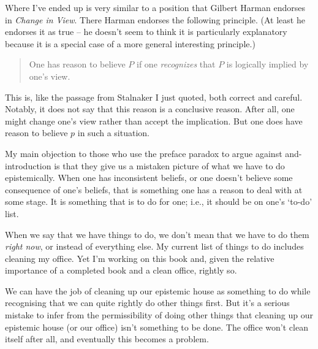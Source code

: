 \documentclass[11pt,]{book}
\begin{document}
Where I've ended up is very similar to a position that Gilbert Harman endorses in \emph{Change in View}. There Harman endorses the following principle. (At least he endorses it as true -- he doesn't seem to think it is particularly explanatory because it is a special case of a more general interesting principle.)

\begin{quote}
One has reason to believe \(P\) if one \emph{recognizes} that \(P\) is logically
implied by one's view. \citep[ 17]{Harman1986}
\end{quote}

This is, like the passage from Stalnaker I just quoted, both correct and careful. Notably, it does not say that this reason is a conclusive reason. After all, one might change one's view rather than accept the implication. But one does have reason to believe \(p\) in such a situation.

My main objection to those who use the preface paradox to argue against and-introduction is that they give us a mistaken picture of what we have to do epistemically. When one has inconsistent beliefs, or one doesn't believe some consequence of one's beliefs, that is something one has a reason to deal with at some stage. It is something that is to do for one; i.e., it should be on one's `to-do' list.

When we say that we have things to do, we don't mean that we have to do them \emph{right now}, or instead of everything else. My current list of things to do includes cleaning my office. Yet I'm working on this book and, given the relative importance of a completed book and a clean office, rightly so.

We can have the job of cleaning up our epistemic house as something to do while recognising that we can quite rightly do other things first. But it's a serious mistake to infer from the permissibility of doing other things that cleaning up our epistemic house (or our office) isn't something to be done. The office won't clean itself after all, and eventually this becomes a problem.
\end{document}
